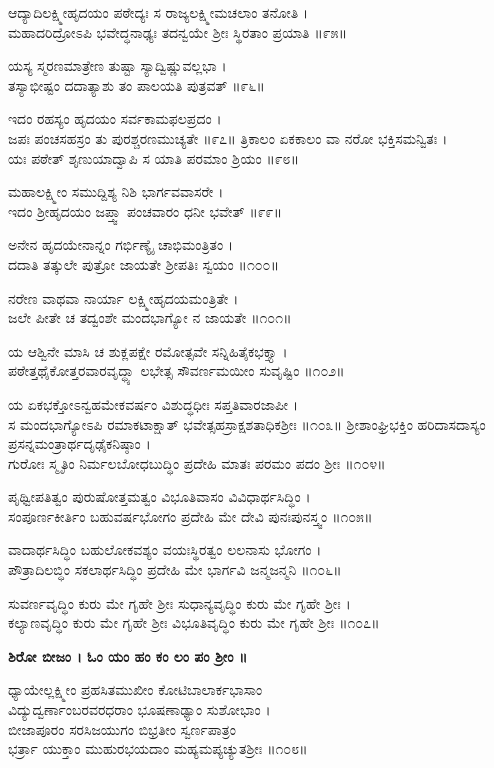 	ಆದ್ಯಾದಿಲಕ್ಷ್ಮೀಹೃದಯಂ ಪಠೇದ್ಯಃ ಸ ರಾಜ್ಯಲಕ್ಷ್ಮೀಮಚಲಾಂ ತನೋತಿ ।\\
	ಮಹಾದರಿದ್ರೋಽಪಿ ಭವೇದ್ಧನಾಢ್ಯಃ ತದನ್ವಯೇ ಶ್ರೀಃ ಸ್ಥಿರತಾಂ ಪ್ರಯಾತಿ ॥೯೫॥

ಯಸ್ಯ ಸ್ಮರಣಮಾತ್ರೇಣ ತುಷ್ಟಾ ಸ್ಯಾದ್ವಿಷ್ಣುವಲ್ಲಭಾ ।\\
ತಸ್ಯಾಭೀಷ್ಟಂ ದದಾತ್ಯಾಶು ತಂ ಪಾಲಯತಿ ಪುತ್ರವತ್ ॥೯೬॥

ಇದಂ ರಹಸ್ಯಂ ಹೃದಯಂ ಸರ್ವಕಾಮಫಲಪ್ರದಂ ।\\
ಜಪಃ ಪಂಚಸಹಸ್ರಂ ತು ಪುರಶ್ಚರಣಮುಚ್ಯತೇ ॥೯೭॥
\newpage
	ತ್ರಿಕಾಲಂ ಏಕಕಾಲಂ ವಾ ನರೋ ಭಕ್ತಿಸಮನ್ವಿತಃ ।\\
	ಯಃ ಪಠೇತ್ ಶೃಣುಯಾದ್ವಾಪಿ ಸ ಯಾತಿ ಪರಮಾಂ ಶ್ರಿಯಂ ॥೯೮॥

ಮಹಾಲಕ್ಷ್ಮೀಂ ಸಮುದ್ದಿಶ್ಯ ನಿಶಿ ಭಾರ್ಗವವಾಸರೇ ।\\
ಇದಂ ಶ್ರೀಹೃದಯಂ ಜಪ್ತ್ವಾ ಪಂಚವಾರಂ ಧನೀ ಭವೇತ್ ॥೯೯॥

	ಅನೇನ ಹೃದಯೇನಾನ್ನಂ ಗರ್ಭಿಣ್ಯೈ ಚಾಭಿಮಂತ್ರಿತಂ ।\\
	ದದಾತಿ ತತ್ಕುಲೇ ಪುತ್ರೋ ಜಾಯತೇ ಶ್ರೀಪತಿಃ ಸ್ವಯಂ ॥೧೦೦॥

ನರೇಣ ವಾಥವಾ ನಾರ್ಯಾ ಲಕ್ಷ್ಮೀಹೃದಯಮಂತ್ರಿತೇ ।\\
ಜಲೇ ಪೀತೇ ಚ ತದ್ವಂಶೇ ಮಂದಭಾಗ್ಯೋ ನ ಜಾಯತೇ ॥೧೦೧॥

ಯ ಆಶ್ವಿನೇ ಮಾಸಿ ಚ ಶುಕ್ಲಪಕ್ಷೇ ರಮೋತ್ಸವೇ ಸನ್ನಿಹಿತೈಕಭಕ್ತ್ಯಾ ।\\
ಪಠೇತ್ತಥೈಕೋತ್ತರವಾರವೃದ್ಧ್ಯಾ ಲಭೇತ್ಸ ಸೌವರ್ಣಮಯೀಂ ಸುವೃಷ್ಟಿಂ ॥೧೦೨॥

	ಯ ಏಕಭಕ್ತೋಽನ್ವಹಮೇಕವರ್ಷಂ ವಿಶುದ್ಧಧೀಃ ಸಪ್ತತಿವಾರಜಾಪೀ ।\\
	ಸ ಮಂದಭಾಗ್ಯೋಽಪಿ ರಮಾಕಟಾಕ್ಷಾತ್ ಭವೇತ್ಸಹಸ್ರಾಕ್ಷಶತಾಧಿಕಶ್ರೀಃ ॥೧೦೩॥
\newpage
ಶ್ರೀಶಾಂಘ್ರಿಭಕ್ತಿಂ ಹರಿದಾಸದಾಸ್ಯಂ ಪ್ರಸನ್ನಮಂತ್ರಾರ್ಥದೃಢೈಕನಿಷ್ಠಾಂ ।\\
ಗುರೋಃ ಸ್ಮೃತಿಂ ನಿರ್ಮಲಬೋಧಬುದ್ಧಿಂ ಪ್ರದೇಹಿ ಮಾತಃ ಪರಮಂ ಪದಂ ಶ್ರೀಃ ॥೧೦೪॥

ಪೃಥ್ವೀಪತಿತ್ವಂ ಪುರುಷೋತ್ತಮತ್ವಂ ವಿಭೂತಿವಾಸಂ ವಿವಿಧಾರ್ಥಸಿದ್ಧಿಂ ।\\
ಸಂಪೂರ್ಣಕೀರ್ತಿಂ ಬಹುವರ್ಷಭೋಗಂ ಪ್ರದೇಹಿ ಮೇ ದೇವಿ ಪುನಃಪುನಸ್ತ್ವಂ ॥೧೦೫॥

	ವಾದಾರ್ಥಸಿದ್ಧಿಂ ಬಹುಲೋಕವಶ್ಯಂ ವಯಃಸ್ಥಿರತ್ವಂ ಲಲನಾಸು ಭೋಗಂ ।\\
	ಪೌತ್ರಾದಿಲಬ್ಧಿಂ ಸಕಲಾರ್ಥಸಿದ್ಧಿಂ ಪ್ರದೇಹಿ ಮೇ ಭಾರ್ಗವಿ ಜನ್ಮಜನ್ಮನಿ ॥೧೦೬॥

ಸುವರ್ಣವೃದ್ಧಿಂ ಕುರು ಮೇ ಗೃಹೇ ಶ್ರೀಃ ಸುಧಾನ್ಯವೃದ್ಧಿಂ ಕುರು ಮೇ ಗೃಹೇ ಶ್ರೀಃ ।\\
ಕಲ್ಯಾಣವೃದ್ಧಿಂ ಕುರು ಮೇ ಗೃಹೇ ಶ್ರೀಃ ವಿಭೂತಿವೃದ್ಧಿಂ ಕುರು ಮೇ ಗೃಹೇ ಶ್ರೀಃ ॥೧೦೭॥

{\bfseries ಶಿರೋ ಬೀಜಂ । ಓಂ ಯಂ ಹಂ ಕಂ ಲಂ ಪಂ ಶ್ರೀಂ ॥}

	ಧ್ಯಾಯೇಲ್ಲಕ್ಷ್ಮೀಂ ಪ್ರಹಸಿತಮುಖೀಂ ಕೋಟಿಬಾಲಾರ್ಕಭಾಸಾಂ\\
	ವಿದ್ಯುದ್ವರ್ಣಾಂಬರವರಧರಾಂ ಭೂಷಣಾಢ್ಯಾಂ ಸುಶೋಭಾಂ ।\\
ಬೀಜಾಪೂರಂ ಸರಸಿಜಯುಗಂ ಬಿಭ್ರತೀಂ ಸ್ವರ್ಣಪಾತ್ರಂ\\
ಭರ್ತ್ರಾ ಯುಕ್ತಾಂ ಮುಹುರಭಯದಾಂ ಮಹ್ಯಮಪ್ಯಚ್ಯುತಶ್ರೀಃ ॥೧೦೮॥

